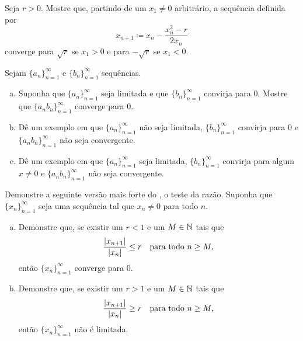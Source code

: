 \begin{exercise}
Seja $r > 0$. Mostre que, partindo de um $x_1 \neq 0$ arbitrário, a sequência
definida por
\begin{equation*}
x_{n+1} \coloneqq x_n - \frac{x_n^2-r}{2x_n}
\end{equation*}
converge para $\sqrt{r}$ se $x_1 > 0$ e para $-\sqrt{r}$ se $x_1 < 0$.
\end{exercise}

\begin{samepage}
\begin{exercise}
Sejam $\{ a_n \}_{n=1}^\infty$ e $\{ b_n \}_{n=1}^\infty$ sequências.
\begin{enumerate}[a)]
\item
Suponha que $\{ a_n \}_{n=1}^\infty$ seja limitada e que $\{ b_n \}_{n=1}^\infty$ convirja para 0.
Mostre que $\{ a_n b_n \}_{n=1}^\infty$ converge para 0.
\item
Dê um exemplo em que $\{ a_n \}_{n=1}^\infty$ não seja limitada, $\{ b_n \}_{n=1}^\infty$ convirja para
0 e $\{ a_n b_n \}_{n=1}^\infty$ não seja convergente.
\item
Dê um exemplo em que $\{ a_n \}_{n=1}^\infty$ seja limitada, $\{ b_n \}_{n=1}^\infty$ convirja para
algum $x \neq 0$ e $\{ a_n b_n \}_{n=1}^\infty$ não seja convergente.
\end{enumerate}
\end{exercise}
\end{samepage}

\begin{samepage}
\begin{exercise}[Fácil] \label{exercise:strongerratiotest1}
Demonstre a seguinte versão mais forte do
, o teste da razão.
Suponha que $\{ x_n \}_{n=1}^\infty$ seja uma sequência tal que $x_n \neq 0$ para todo
$n$.
\begin{enumerate}[a)]
\item
Demonstre que, se existir um $r < 1$ e um $M \in {\mathbb{N}}$ tais que
\begin{equation*}
\frac{\lvert {x_{n+1}} \rvert}{\lvert {x_n} \rvert} \leq r \quad \text{para todo } n \geq M,
\end{equation*}
então $\{ x_n \}_{n=1}^\infty$ converge para $0$.
\item
Demonstre que, se existir um $r > 1$ e um $M \in {\mathbb{N}}$ tais que
\begin{equation*}
\frac{\lvert {x_{n+1}} \rvert}{\lvert {x_n} \rvert} \geq r \quad \text{para todo } n \geq M,
\end{equation*}
então $\{ x_n \}_{n=1}^\infty$ não é limitada.
\end{enumerate}
\end{exercise}
\end{samepage}

